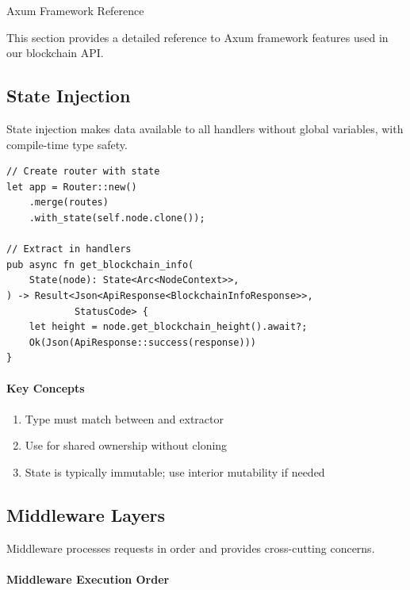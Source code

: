 \begin{deepdive}{Axum Framework Reference}

This section provides a detailed reference to Axum framework features used in our blockchain API.

\subsection{State Injection}

State injection makes data available to all handlers without global variables, with compile-time type safety.

\begin{listing}[H]
\caption{State injection pattern}
\label{lst:axum-state}
\begin{verbatim}
// Create router with state
let app = Router::new()
    .merge(routes)
    .with_state(self.node.clone());

// Extract in handlers
pub async fn get_blockchain_info(
    State(node): State<Arc<NodeContext>>,
) -> Result<Json<ApiResponse<BlockchainInfoResponse>>,
            StatusCode> {
    let height = node.get_blockchain_height().await?;
    Ok(Json(ApiResponse::success(response)))
}
\end{verbatim}
\end{listing}

\paragraph{Key Concepts}

\begin{enumerate}
  \item Type must match between  and  extractor
  \item Use  for shared ownership without cloning
  \item State is typically immutable; use interior mutability if needed
\end{enumerate}

\subsection{Middleware Layers}

Middleware processes requests in order and provides cross-cutting concerns.

\paragraph{Middleware Execution Order}


\end{deepdive}
